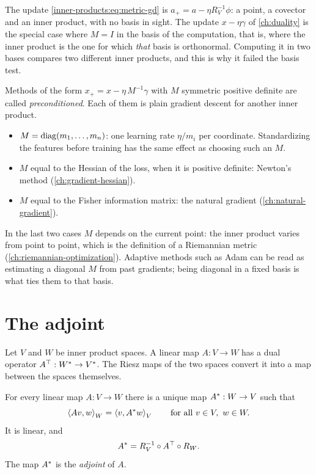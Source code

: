 \begin{notechapter}
\begin{keyidea}
The update \eqref{inner-products:eq:metric-gd} is
$a_+ = a - \eta R_V^{-1}\phi$: a point, a covector and an inner product,
with no basis in sight. The update $x - \eta\gamma$ of \cref{ch:duality} is
the special case where $M = I$ in the basis of the computation, that is,
where the inner product is the one for which \emph{that} basis is
orthonormal. Computing it in two bases compares two different inner
products, and this is why it failed the basis test.
\end{keyidea}

\begin{mlthread}
Methods of the form $x_+ = x - \eta\,M^{-1}\gamma$ with $M$ symmetric
positive definite are called \emph{preconditioned}. Each of them is plain
gradient descent for another inner product.
\begin{itemize}[nosep]
  \item $M = \operatorname{diag}(m_1,\dots,m_n)$: one learning rate $\eta/m_i$ per
        coordinate. Standardizing the features before training has the
        same effect as choosing such an $M$.
  \item $M$ equal to the Hessian of the loss, when it is positive
        definite: Newton's method (\cref{ch:gradient-hessian}).
  \item $M$ equal to the Fisher information matrix: the natural gradient
        (\cref{ch:natural-gradient}).
\end{itemize}
In the last two cases $M$ depends on the current point: the inner product
varies from point to point, which is the definition of a Riemannian metric
(\cref{ch:riemannian-optimization}). Adaptive methods such as Adam can be
read as estimating a diagonal $M$ from past gradients; being diagonal in a
fixed basis is what ties them to that basis.
\end{mlthread}

\section{The adjoint}\label{inner-products:sec:adjoint}

Let $V$ and $W$ be inner product spaces. A linear map $A:V\to W$ has a dual
operator $A^{\top}:W^*\to V^*$. The Riesz maps of the two spaces convert it
into a map between the spaces themselves.

\begin{theorem}[Adjoint]\label{inner-products:thm:adjoint}
For every linear map $A:V\to W$ there is a unique map $A^{*}:W\to V$ such
that
\begin{equation}\label{inner-products:eq:adjoint}
  \left\langle Av, w \right\rangle_W = \left\langle v, A^{*}w \right\rangle_V
  \qquad\text{for all }v\in V,\ w\in W .
\end{equation}
It is linear, and
\[
  A^{*} = R_V^{-1}\circ A^{\top}\circ R_W .
\]
The map $A^{*}$ is the \emph{adjoint} of $A$.
\end{theorem}


\end{notechapter}
